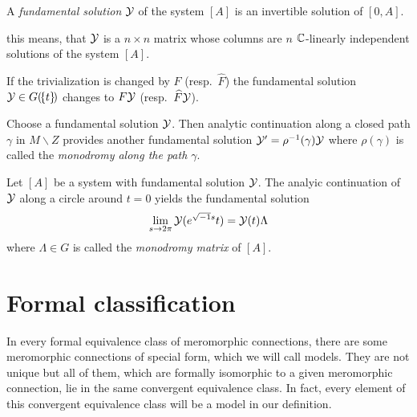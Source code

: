 \begin{defn}
  A \emph{fundamental solution} $\mathcal{Y}$ of the system $[A]$ is an invertible
  solution of $[0,A]$.
  \begin{s-rem}
    this means, that $\mathcal{Y}$ is a $n\times n$ matrix  whose columns are $n$ $\mathbb{C}$-linearly independent solutions of the
    system $[A]$.
  \end{s-rem}
\end{defn}

\begin{rem}
  If the trivialization is changed by $F$ (resp.\ $\hat F$) the fundamental
  solution $\mathcal{Y}\in G(\!\{t\}\!)$ changes to $F\mathcal{Y}$ (resp.\ $\widehat F\mathcal{Y}$).
\end{rem}

\begin{comment}
  Unique \textbf{up to permutation}?\ or up to basis change?\ in the ramified
  case up to \TODO{}
\end{comment}

Choose a fundamental solution $\mathcal{Y}$. Then analytic continuation along a closed
path $\gamma$ in $M\backslash Z$ provides another fundamental solution
$\mathcal{Y}'=\rho^{-1}(\gamma)\mathcal{Y}$ where $\rho(\gamma)$ is called the \emph{monodromy
along the path $\gamma$}.
\begin{defn}
  Let $[A]$ be a system with fundamental solution $\mathcal{Y}$.
  The analyic continuation of $\mathcal{Y}$ along a circle around $t=0$ yields the
  fundamental solution
  \[
    \lim_{s\to2\pi}\mathcal{Y}(e^{\sqrt{-1}s}t)=\mathcal{Y}(t)\Lambda
  \]
  where $\Lambda\in G$ is called the \emph{monodromy matrix} of $[A]$.
\end{defn}

 

\begin{comment}
  \subsection{Ramification}
  \marginnote{\cite[I.5.4.1]{sabbah_cimpa90}}
\end{comment}

\section{Formal classification}\label{sec:formalClassification}
In every formal equivalence class of meromorphic connections, there are some
meromorphic connections of special form, which we will call models. They are
not unique but all of them, which are formally isomorphic to a given
meromorphic connection, lie in the same convergent equivalence class.
In fact, every element of this convergent equivalence class will be a model in
our definition.

